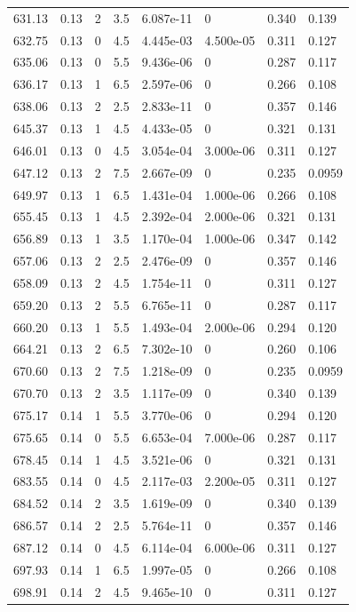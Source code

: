 \documentclass[preview]{standalone}
\begin{document}
{{{{{{{\begin{tabular}{L{1.2cm}C{1.2cm} C{0.3cm}C{0.5cm} C{1.4cm}C{1.4cm} C{1.4cm}C{1.4cm}}
  631.13  &  0.13  & 2     & 3.5 &  6.087e-11  & 0  & 0.340 &  0.139   \\ 
  632.75  &  0.13  & 0     & 4.5 &  4.445e-03  & 4.500e-05  & 0.311 &  0.127   \\ 
  635.06  &  0.13  & 0     & 5.5 &  9.436e-06  & 0  & 0.287 &  0.117   \\ 
  636.17  &  0.13  & 1     & 6.5 &  2.597e-06  & 0  & 0.266 &  0.108   \\ 
  638.06  &  0.13  & 2     & 2.5 &  2.833e-11  & 0  & 0.357 &  0.146   \\ 
  645.37  &  0.13  & 1     & 4.5 &  4.433e-05  & 0  & 0.321 &  0.131   \\ 
  646.01  &  0.13  & 0     & 4.5 &  3.054e-04  & 3.000e-06  & 0.311 &  0.127   \\ 
  647.12  &  0.13  & 2     & 7.5 &  2.667e-09  & 0  & 0.235 &  0.0959   \\ 
  649.97  &  0.13  & 1     & 6.5 &  1.431e-04  & 1.000e-06  & 0.266 &  0.108   \\ 
  655.45  &  0.13  & 1     & 4.5 &  2.392e-04  & 2.000e-06  & 0.321 &  0.131   \\ 
  656.89  &  0.13  & 1     & 3.5 &  1.170e-04  & 1.000e-06  & 0.347 &  0.142   \\ 
  657.06  &  0.13  & 2     & 2.5 &  2.476e-09  & 0  & 0.357 &  0.146   \\ 
  658.09  &  0.13  & 2     & 4.5 &  1.754e-11  & 0  & 0.311 &  0.127   \\ 
  659.20  &  0.13  & 2     & 5.5 &  6.765e-11  & 0  & 0.287 &  0.117   \\ 
  660.20  &  0.13  & 1     & 5.5 &  1.493e-04  & 2.000e-06  & 0.294 &  0.120   \\ 
  664.21  &  0.13  & 2     & 6.5 &  7.302e-10  & 0  & 0.260 &  0.106   \\ 
  670.60  &  0.13  & 2     & 7.5 &  1.218e-09  & 0  & 0.235 &  0.0959   \\ 
  670.70  &  0.13  & 2     & 3.5 &  1.117e-09  & 0  & 0.340 &  0.139   \\ 
  675.17  &  0.14  & 1     & 5.5 &  3.770e-06  & 0  & 0.294 &  0.120   \\ 
  675.65  &  0.14  & 0     & 5.5 &  6.653e-04  & 7.000e-06  & 0.287 &  0.117   \\ 
  678.45  &  0.14  & 1     & 4.5 &  3.521e-06  & 0  & 0.321 &  0.131   \\ 
  683.55  &  0.14  & 0     & 4.5 &  2.117e-03  & 2.200e-05  & 0.311 &  0.127   \\ 
  684.52  &  0.14  & 2     & 3.5 &  1.619e-09  & 0  & 0.340 &  0.139   \\ 
  686.57  &  0.14  & 2     & 2.5 &  5.764e-11  & 0  & 0.357 &  0.146   \\ 
  687.12  &  0.14  & 0     & 4.5 &  6.114e-04  & 6.000e-06  & 0.311 &  0.127   \\ 
  697.93  &  0.14  & 1     & 6.5 &  1.997e-05  & 0  & 0.266 &  0.108   \\ 
  698.91  &  0.14  & 2     & 4.5 &  9.465e-10  & 0  & 0.311 &  0.127   \\ 
\hline 
\end{tabular} 

}}}}}}}
\end{document}
